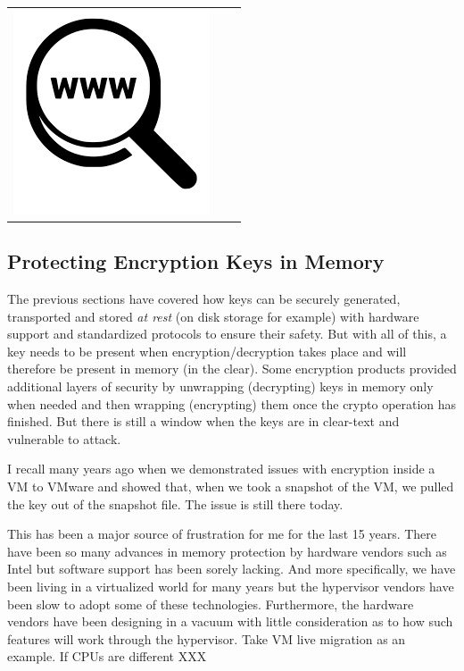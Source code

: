 \begin{table}[h]
\begin{tabular}{lcl}
\parbox[r]{0.5in}{\includegraphics[scale=0.15]{figures/url.png}} & \parbox[l]{0.1in}{} & \parbox[l]{3in}{}
\end{tabular}
\end{table}

\subsection{Protecting Encryption Keys in Memory}

The previous sections have covered how keys can be securely generated, transported and stored \textit{at rest} (on disk storage for example) with hardware support and standardized protocols to ensure their safety. But with all of this, a key needs to be present when encryption/decryption takes place and will therefore be present in memory (in the clear). Some encryption products provided additional layers of security by unwrapping (decrypting) keys in memory only when needed and then wrapping (encrypting) them once the crypto operation has finished. But there is still a window when the keys are in clear-text and vulnerable to attack.

I recall many years ago when we demonstrated issues with encryption inside a VM to VMware and showed that, when we took a snapshot of the VM, we pulled the key out of the snapshot file. The issue is still there today.

This has been a major source of frustration for me for the last 15 years. There have been so many advances in memory protection by hardware vendors such as Intel but software support has been sorely lacking. And more specifically, we have been living in a virtualized world for many years but the hypervisor vendors have been slow to adopt some of these technologies. Furthermore, the hardware vendors have been designing in a vacuum with little consideration as to how such features will work through the hypervisor. Take VM live migration as an example. If CPUs are different XXX

